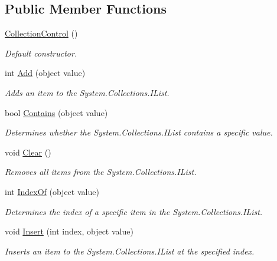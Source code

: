 \subsection*{Public Member Functions}
\begin{DoxyCompactItemize}
\item 
\mbox{\hyperlink{class_wpf_handler_1_1_u_i_1_1_controls_1_1_collection_control_a5228b3f2d5efec75b178a160bfd9a558}{Collection\+Control}} ()
\begin{DoxyCompactList}\small\item\em Default constructor. \end{DoxyCompactList}\item 
int \mbox{\hyperlink{class_wpf_handler_1_1_u_i_1_1_controls_1_1_collection_control_ae17242c33bd29c2545a06bba9c93a1df}{Add}} (object value)
\begin{DoxyCompactList}\small\item\em Adds an item to the System.\+Collections.\+I\+List. \end{DoxyCompactList}\item 
bool \mbox{\hyperlink{class_wpf_handler_1_1_u_i_1_1_controls_1_1_collection_control_ae703be50b290be72a7a40acbfe65b04c}{Contains}} (object value)
\begin{DoxyCompactList}\small\item\em Determines whether the System.\+Collections.\+I\+List contains a specific value. \end{DoxyCompactList}\item 
void \mbox{\hyperlink{class_wpf_handler_1_1_u_i_1_1_controls_1_1_collection_control_a1f1a7fd996c4e15ec7fe3b2724e962d3}{Clear}} ()
\begin{DoxyCompactList}\small\item\em Removes all items from the System.\+Collections.\+I\+List. \end{DoxyCompactList}\item 
int \mbox{\hyperlink{class_wpf_handler_1_1_u_i_1_1_controls_1_1_collection_control_ad2021b989a7f5aae430e12727a918982}{Index\+Of}} (object value)
\begin{DoxyCompactList}\small\item\em Determines the index of a specific item in the System.\+Collections.\+I\+List. \end{DoxyCompactList}\item 
void \mbox{\hyperlink{class_wpf_handler_1_1_u_i_1_1_controls_1_1_collection_control_ae89cb3b260d441186bac7ee953f4c028}{Insert}} (int index, object value)
\begin{DoxyCompactList}\small\item\em Inserts an item to the System.\+Collections.\+I\+List at the specified index. \end{DoxyCompactList}\item 

\end{DoxyCompactItemize}
